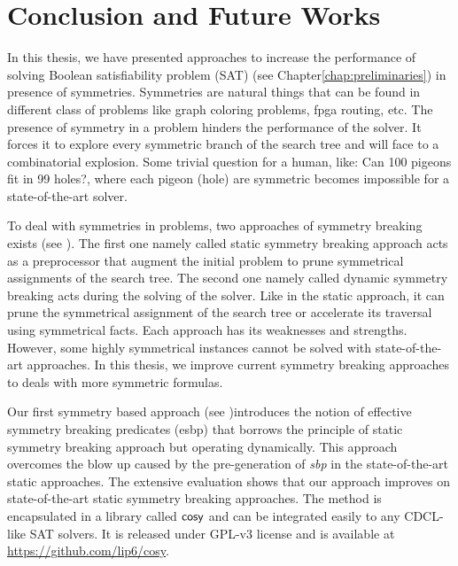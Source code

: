 \chapter{Conclusion and Future Works}\label{chap:conclu}



In this thesis, we have presented approaches to increase the performance of solving 
Boolean satisfiability problem (SAT) (see Chapter\ref{chap:preliminaries}) in presence of symmetries. 
Symmetries are natural things that can be found in different class of problems like
graph coloring problems, fpga routing, etc.
The presence of symmetry in a problem hinders the performance of the solver. It forces
it to explore every symmetric branch of the search tree and will face to a combinatorial explosion.
Some trivial question for a human, like: Can 100 pigeons fit in 99 holes?,
where each pigeon (hole) are symmetric becomes impossible for a state-of-the-art solver. 


To deal with symmetries in problems, two approaches of symmetry breaking exists (see ).
The first one namely called static symmetry breaking approach acts as a preprocessor that augment the initial
problem to prune symmetrical assignments of the search tree. The second one namely called dynamic symmetry breaking 
acts during the solving of the solver. Like in the static approach, it can  prune the symmetrical assignment of the 
search tree or accelerate its traversal using symmetrical facts.
Each approach has its weaknesses and strengths. However, some highly symmetrical instances cannot be solved with
state-of-the-art approaches. In this thesis, we improve current symmetry breaking approaches to 
deals with more symmetric formulas.


%
%

Our first symmetry based approach (see )introduces the notion of effective symmetry breaking predicates (esbp) that borrows the principle of static symmetry breaking approach but operating dynamically\cite{metin2018cdclsym}.
This approach overcomes the blow up caused by the pre-generation of \textit{sbp} in the state-of-the-art 
static approaches. The extensive evaluation shows that our approach improves on state-of-the-art static 
symmetry breaking approaches.
The method is encapsulated in a library called $\textsf{cosy}$ and can be integrated easily to any
CDCL-like SAT solvers. It is released under GPL-v3 license and is available at \url{https://github.com/lip6/cosy}.

